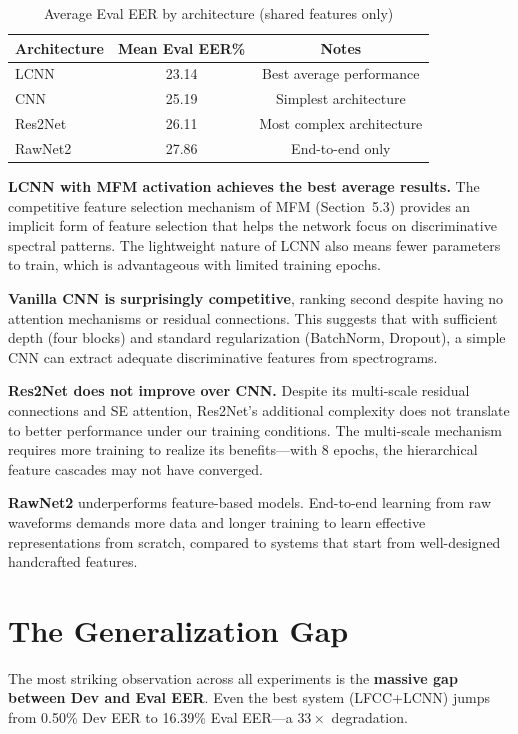 \documentclass[12pt]{report}
\begin{document}
\begin{table}[h!]
\centering
\caption{Average Eval EER by architecture (shared features only)}
\label{tab:arch-avg}
\begin{tabularx}{0.72\textwidth}{lcc}
\toprule
\textbf{Architecture} & \textbf{Mean Eval EER\%} & \textbf{Notes} \\
\midrule
LCNN    & 23.14 & Best average performance \\
CNN     & 25.19 & Simplest architecture \\
Res2Net & 26.11 & Most complex architecture \\
RawNet2 & 27.86 & End-to-end only \\
\bottomrule
\end{tabularx}
\end{table}

\textbf{LCNN with MFM activation achieves the best average results.} The competitive feature
selection mechanism of MFM (Section~5.3) provides an implicit form of feature selection that
helps the network focus on discriminative spectral patterns. The lightweight nature of LCNN
also means fewer parameters to train, which is advantageous with limited training epochs.

\textbf{Vanilla CNN is surprisingly competitive}, ranking second despite having no attention
mechanisms or residual connections. This suggests that with sufficient depth (four blocks) and
standard regularization (BatchNorm, Dropout), a simple CNN can extract adequate discriminative
features from spectrograms.

\textbf{Res2Net does not improve over CNN.} Despite its multi-scale residual connections and
SE attention, Res2Net's additional complexity does not translate to better performance under
our training conditions. The multi-scale mechanism requires more training to realize its
benefits---with 8 epochs, the hierarchical feature cascades may not have converged.

\textbf{RawNet2} underperforms feature-based models. End-to-end learning from raw waveforms
demands more data and longer training to learn effective representations from scratch, compared
to systems that start from well-designed handcrafted features.

\section{The Generalization Gap}

The most striking observation across all experiments is the \textbf{massive gap between Dev
and Eval EER}. Even the best system (LFCC+LCNN) jumps from 0.50\% Dev EER to 16.39\% Eval
EER---a $33\times$ degradation.
\end{document}
